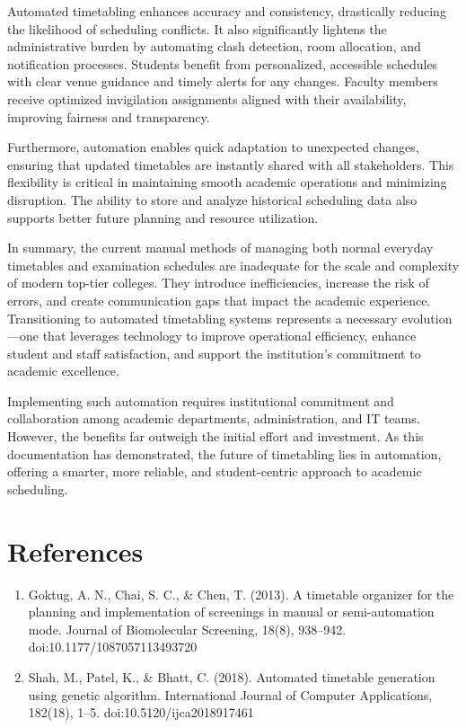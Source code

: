 \documentclass[a4paper,12pt]{article}
\begin{document}
Automated timetabling enhances accuracy and consistency, drastically reducing the likelihood of scheduling conflicts. It also significantly lightens the administrative burden by automating clash detection, room allocation, and notification processes. Students benefit from personalized, accessible schedules with clear venue guidance and timely alerts for any changes. Faculty members receive optimized invigilation assignments aligned with their availability, improving fairness and transparency.\newline

Furthermore, automation enables quick adaptation to unexpected changes, ensuring that updated timetables are instantly shared with all stakeholders. This flexibility is critical in maintaining smooth academic operations and minimizing disruption. The ability to store and analyze historical scheduling data also supports better future planning and resource utilization.\newline

In summary, the current manual methods of managing both normal everyday timetables and examination schedules are inadequate for the scale and complexity of modern top-tier colleges. They introduce inefficiencies, increase the risk of errors, and create communication gaps that impact the academic experience. Transitioning to automated timetabling systems represents a necessary evolution—one that leverages technology to improve operational efficiency, enhance student and staff satisfaction, and support the institution’s commitment to academic excellence.\newline

Implementing such automation requires institutional commitment and collaboration among academic departments, administration, and IT teams. However, the benefits far outweigh the initial effort and investment. As this documentation has demonstrated, the future of timetabling lies in automation, offering a smarter, more reliable, and student-centric approach to academic scheduling.\newline


  
%
\newpage
% 
\section*{References}
\begin{enumerate}
    \item Goktug, A. N., Chai, S. C., & Chen, T. (2013). A timetable organizer for the planning and implementation of screenings in manual or semi-automation mode. Journal of Biomolecular Screening, 18(8), 938–942.
doi:10.1177/1087057113493720

    \item Shah, M., Patel, K., & Bhatt, C. (2018). Automated timetable generation using genetic algorithm. International Journal of Computer Applications,
182(18), 1–5. doi:10.5120/ijca2018917461
\end{enumerate}
\end{document}

